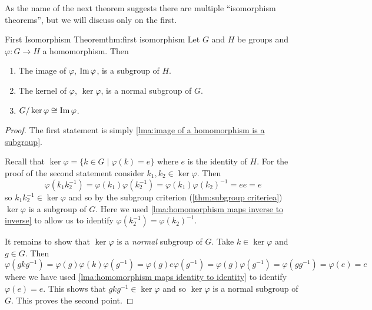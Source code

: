 As the name of the next theorem suggests there are multiple \enquote{isomorphism theorems}, but we will discuss only on the first.
\begin{thm}{First Isomorphism Theorem}{thm:first isomorphism}
    Let \(G\) and \(H\) be groups and \(\varphi \colon G \to H\) a homomorphism.
    Then
    \begin{enumerate}
        \item The image of \(\varphi\), \(\operatorname{Im}\varphi\), is a subgroup of \(H\).
        \item The kernel of \(\varphi\), \(\ker\varphi\), is a normal subgroup of \(G\).
        \item \(G/\ker \varphi \cong \operatorname{Im} \varphi\).
    \end{enumerate}
    \begin{proof}
        The first statement is simply \cref{lma:image of a homomorphism is a subgroup}.
        
        Recall that \(\ker\varphi = \{k \in G \mid \varphi(k) = e\}\) where \(e\) is the identity of \(H\).
        For the proof of the second statement consider \(k_1, k_2 \in \ker\varphi\).
        Then
        \begin{equation}
            \varphi(k_1k_2^{-1}) = \varphi(k_1)\varphi(k_2^{-1}) = \varphi(k_1)\varphi(k_2)^{-1} = ee = e
        \end{equation}
        so \(k_1k_2^{-1} \in \ker\varphi\) and so by the subgroup criterion (\cref{thm:subgroup criteriea}) \(\ker\varphi\) is a subgroup of \(G\).
        Here we used \cref{lma:homomorphism maps inverse to inverse} to allow us to identify \(\varphi(k_2^{-1}) = \varphi(k_2)^{-1}\).
        
        It remains to show that \(\ker\varphi\) is a \emph{normal} subgroup of \(G\).
        Take \(k \in \ker\varphi\) and \(g \in G\).
        Then
        \begin{equation}
            \varphi(gkg^{-1}) = \varphi(g)\varphi(k)\varphi(g^{-1}) = \varphi(g)e\varphi(g^{-1}) = \varphi(g)\varphi(g^{-1}) = \varphi(gg^{-1}) = \varphi(e) =e
        \end{equation}
        where we have used \cref{lma:homomorphism maps identity to identity} to identify \(\varphi(e) = e\).
        This shows that \(gkg^{-1} \in \ker\varphi\) and so \(\ker\varphi\) is a normal subgroup of \(G\).
        This proves the second point.
        

\end{proof}
\end{thm}
